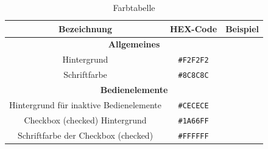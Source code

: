 \begin{table}[h!]
	\centering
	\begin{tabular}{ |c|c|c|}
		\hline
		\textbf{Bezeichnung} & \textbf{HEX-Code} & \textbf{Beispiel}\\
		\hline
		
		
		\hline
		\multicolumn{3}{|c|}{\textbf{Allgemeines}}\\
		\hline
		Hintergrund & \texttt{\#F2F2F2} &\cellcolor[HTML]{F2F2F2}\\
		\hline
		Schriftfarbe & \texttt{\#8C8C8C} &\cellcolor[HTML]{8C8C8C}\\
		\hline
		
		
		\hline
		\multicolumn{3}{|c|}{\textbf{Bedienelemente}}\\
		\hline
		Hintergrund für inaktive Bedienelemente & \texttt{\#CECECE} &\cellcolor[HTML]{CECECE}\\
		\hline
		Checkbox (checked) Hintergrund & \texttt{\#1A66FF} &\cellcolor[HTML]{1A66FF}\\
		\hline
		Schriftfarbe der Checkbox (checked) & \texttt{\#FFFFFF} &\cellcolor[HTML]{FFFFFF}\\
		\hline
	\end{tabular}
	\caption{Farbtabelle} \label{tab:farbtabelle}
\end{table}

